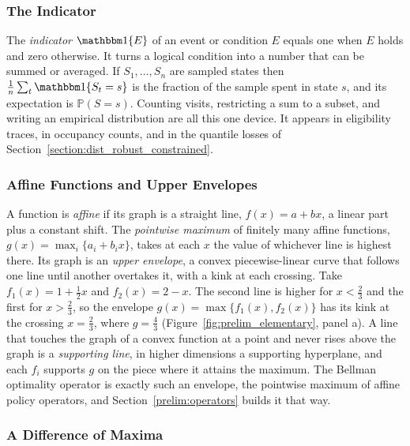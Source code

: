\subsubsection{The Indicator}
\label{prelim:indicator}

The \emph{indicator} $\indicator{E}$ of an event or condition $E$ equals one when $E$ holds and zero otherwise. It turns a logical condition into a number that can be summed or averaged. If $S_1, \ldots, S_n$ are sampled states then $\frac{1}{n}\sum_t \indicator{S_t = s}$ is the fraction of the sample spent in state $s$, and its expectation is $\mathbb{P}(S = s)$. Counting visits, restricting a sum to a subset, and writing an empirical distribution are all this one device. It appears in eligibility traces, in occupancy counts, and in the quantile losses of Section~\ref{section:dist_robust_constrained}.

\subsubsection{Affine Functions and Upper Envelopes}
\label{prelim:affine_envelope}

A function is \emph{affine} if its graph is a straight line, $f(x) = a + bx$, a linear part plus a constant shift. The \emph{pointwise maximum} of finitely many affine functions, $g(x) = \max_i \{a_i + b_i x\}$, takes at each $x$ the value of whichever line is highest there. Its graph is an \emph{upper envelope}, a convex piecewise-linear curve that follows one line until another overtakes it, with a kink at each crossing. Take $f_1(x) = 1 + \tfrac{1}{2}x$ and $f_2(x) = 2 - x$. The second line is higher for $x < \tfrac{2}{3}$ and the first for $x > \tfrac{2}{3}$, so the envelope $g(x) = \max\{f_1(x), f_2(x)\}$ has its kink at the crossing $x = \tfrac{2}{3}$, where $g = \tfrac{4}{3}$ (Figure~\ref{fig:prelim_elementary}, panel a). A line that touches the graph of a convex function at a point and never rises above the graph is a \emph{supporting line}, in higher dimensions a supporting hyperplane, and each $f_i$ supports $g$ on the piece where it attains the maximum. The Bellman optimality operator is exactly such an envelope, the pointwise maximum of affine policy operators, and Section~\ref{prelim:operators} builds it that way.

\subsubsection{A Difference of Maxima}
\label{prelim:maxdiff}

